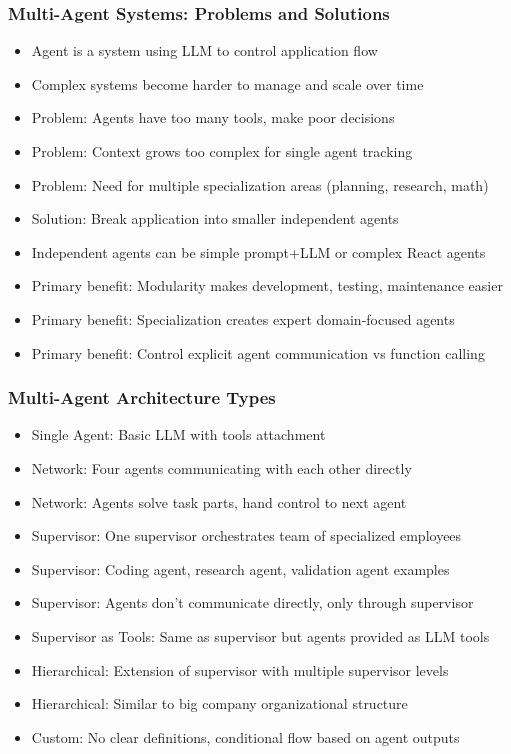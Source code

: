 \begin{frame}[fragile]\frametitle{Multi-Agent Systems: Problems and Solutions}
      \begin{itemize}
          \item Agent is a system using LLM to control application flow
          \item Complex systems become harder to manage and scale over time
          \item Problem: Agents have too many tools, make poor decisions
          \item Problem: Context grows too complex for single agent tracking
          \item Problem: Need for multiple specialization areas (planning, research, math)
          \item Solution: Break application into smaller independent agents
          \item Independent agents can be simple prompt+LLM or complex React agents
          \item Primary benefit: Modularity makes development, testing, maintenance easier
          \item Primary benefit: Specialization creates expert domain-focused agents
          \item Primary benefit: Control explicit agent communication vs function calling
      \end{itemize}
\end{frame}
\begin{frame}[fragile]\frametitle{Multi-Agent Architecture Types}
      \begin{itemize}
          \item Single Agent: Basic LLM with tools attachment
          \item Network: Four agents communicating with each other directly
          \item Network: Agents solve task parts, hand control to next agent
          \item Supervisor: One supervisor orchestrates team of specialized employees
          \item Supervisor: Coding agent, research agent, validation agent examples
          \item Supervisor: Agents don't communicate directly, only through supervisor
          \item Supervisor as Tools: Same as supervisor but agents provided as LLM tools
          \item Hierarchical: Extension of supervisor with multiple supervisor levels
          \item Hierarchical: Similar to big company organizational structure
          \item Custom: No clear definitions, conditional flow based on agent outputs
      \end{itemize}
\end{frame}
